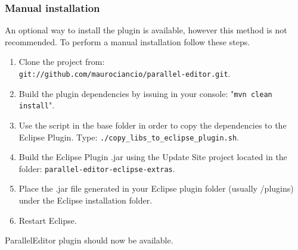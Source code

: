 \subsubsection{Manual installation}

An optional way to install the plugin is available, however this method is not recommended. To perform a manual installation follow these steps.

\begin{enumerate}
\item Clone the project from: \\
\texttt{git://github.com/maurociancio/parallel-editor.git}.
\item Build the plugin dependencies by issuing in your console: "\texttt{mvn clean install}".
\item Use the script in the base folder in order to copy the dependencies to the Eclipse Plugin. Type: \texttt{./copy\_libs\_to\_eclipse\_plugin.sh}.
\item Build the Eclipse Plugin .jar using the Update Site project located in the folder: \texttt{parallel-editor-eclipse-extras}.
\item Place the .jar file generated in your Eclipse plugin folder  (usually /plugins) under the Eclipse installation folder.
\item Restart Eclipse.
\end{enumerate}

ParallelEditor plugin should now be available.

